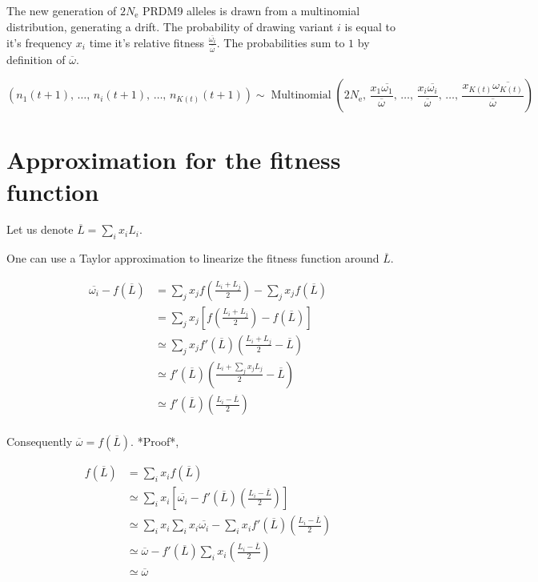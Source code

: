 \documentclass{article}
\begin{document}
The new generation of $2 N_\mathrm{e}$ PRDM9 alleles is drawn from a multinomial distribution, generating a drift. The probability of drawing variant $i$ is equal to it's frequency $x_i$ time it's relative fitness  $\tfrac{\overline{\omega_i}}{\overline{\omega}}$. The probabilities sum to $1$ by definition of $\overline{\omega}$.

\begin{equation}
  \left(
  n_1(t+1), \,
  \dots, \,
  n_i(t+1), \,
  \dots, \,
  n_{K(t)}(t+1)
  \right)
  \sim \operatorname{Multinomial} \left(2 N_\mathrm{e}, \,
  \dfrac{x_1  \overline{\omega_1}}{\overline{\omega}}, \,
  \dots, \,
  \dfrac{x_i  \overline{\omega_i}}{\overline{\omega}}, \,
  \dots, \,
  \dfrac{x_{K(t)} \overline{\omega_{K(t)}}}{\overline{\omega}}
  \right)
\end{equation}


\section{Approximation for the fitness function}
Let us denote $\overline{L}=\sum_i x_i L_i$.

One can use a Taylor approximation to linearize the fitness function around $\overline{L}$.  

\begin{equation}
  \begin{aligned}
    \overline{\omega_i} - f(\overline{L}) &=
    \sum_j x_j f \left( \tfrac{L_i + L_j}{2} \right) - \sum_j x_j f(\overline{L}) \\
    &=
    \sum_j x_j  \left[ f \left( \tfrac{L_i + L_j}{2} \right) - f(\overline{L}) \right] \\
    &\simeq
    \sum_j x_j  f'(\overline{L}) \left( \tfrac{L_i + L_j}{2} - \overline{L} \right) \\
    &\simeq
     f'(\overline{L}) \left( \tfrac{L_i + \sum_j x_j L_j}{2} - \overline{L} \right) \\
     &\simeq
     f'(\overline{L}) \left( \tfrac{L_i - \overline{L}}{2}\right) \\
  \end{aligned}
\end{equation}

Consequently $\overline{\omega} = f(\overline{L})$. *Proof*,

\begin{equation}
  \begin{aligned}
    f(\overline{L}) &= \sum_i x_i f(\overline{L}) \\
    &\simeq \sum_i x_i \left[ \overline{\omega_i} - f'(\overline{L}) \left( \tfrac{L_i - \overline{L}}{2}\right) \right] \\
    &\simeq
    \sum_i x_i \sum_i x_i \overline{\omega_i} - \sum_i x_i f'(\overline{L}) \left( \tfrac{L_i - \overline{L}}{2}\right) \\
    &\simeq
     \overline{\omega} - f'(\overline{L}) \sum_i x_i \left( \tfrac{L_i - \overline{L}}{2}\right) \\
    &\simeq
     \overline{\omega}
  \end{aligned}
\end{equation}
\end{document}
